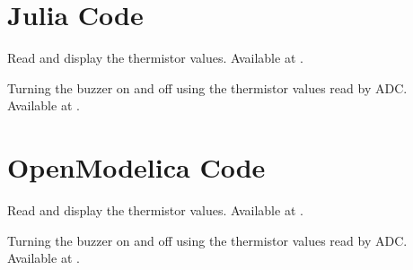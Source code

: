 

\section{Julia Code}
\label{sec:therm-julia-code}

\begin{juliacode}
 {Read and display
    the thermistor values.  Available at
  .}
\label{julia:therm-read}

\end{juliacode}

\begin{juliacode}
  {Turning the buzzer on and off using the thermistor values read by
    ADC.  Available at .}
\label{julia:therm-buzzer}

\end{juliacode}




\section{OpenModelica Code}
\label{sec:therm-OpenModelica-code}

\begin{OpenModelicacode}
 {Read and display
    the thermistor values.  Available at
  .}
\label{OpenModelica:therm-read}

\end{OpenModelicacode}

\begin{OpenModelicacode}
  {Turning the buzzer on and off using the thermistor values read by
    ADC.  Available at .}
\label{OpenModelica:therm-buzzer}

\end{OpenModelicacode}

